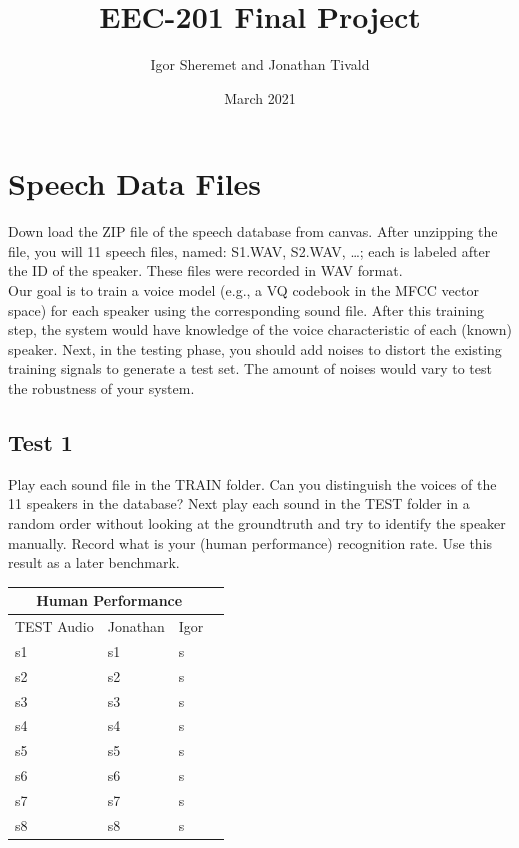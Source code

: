 \documentclass{article}
\title{EEC-201 Final Project}
\author{Igor Sheremet and Jonathan Tivald }
\date{March 2021}
\begin{document}
\maketitle

\section{Speech Data Files}
Down load the ZIP file of the speech database from canvas. After unzipping the file, you will 11 speech
files, named: S1.WAV, S2.WAV, …; each is labeled after the ID of the speaker. These files were recorded
in WAV format.\\
Our goal is to train a voice model (e.g., a VQ codebook in the MFCC vector space) for each speaker using
the corresponding sound file. After this training step, the system would have knowledge of the voice
characteristic of each (known) speaker. Next, in the testing phase, you should add noises to distort the
existing training signals to generate a test set. The amount of noises would vary to test the robustness of
your system.

\subsection{Test 1}
Play each sound file in the TRAIN folder. Can you distinguish the voices of the 11 speakers in
the database? Next play each sound in the TEST folder in a random order without looking at the
groundtruth and try to identify the speaker manually. Record what is your (human performance)
recognition rate. Use this result as a later benchmark.

\vspace{5mm} %

    \begin{tabular}{ |p{3cm}|p{3cm}|p{3cm}|p{3cm}|  }
        \hline
        \multicolumn{3}{|c|}{Human Performance} \\
        \hline
        TEST Audio & Jonathan & Igor\\
        \hline
        s1& s1 & s\\
        s2& s2 & s\\
        s3& s3 & s\\
        s4& s4 & s\\
        s5& s5 & s\\
        s6& s6 & s\\
        s7& s7 & s\\
        s8& s8 & s\\
        \hline
    \end{tabular}
\end{document}
